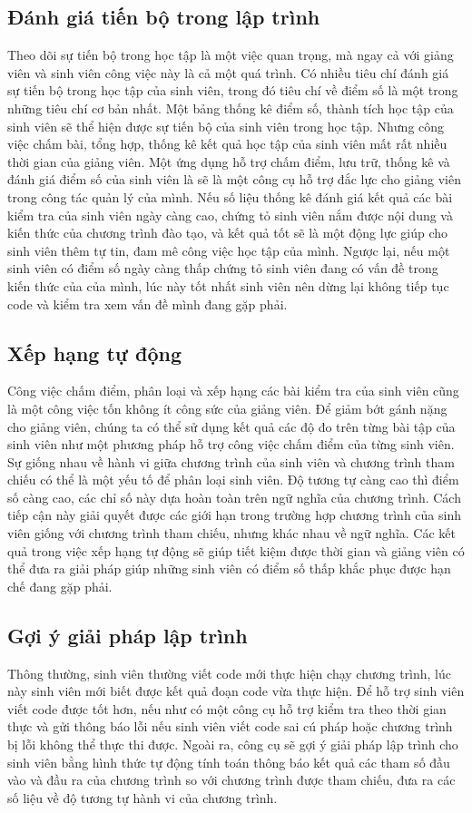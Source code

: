 \subsection{Đánh giá tiến bộ trong lập trình}
Theo dõi sự tiến bộ trong học tập là một việc quan trọng, mà ngay cả với giảng viên và sinh viên công việc này là cả một quá trình. Có nhiều tiêu chí đánh giá sự tiến bộ trong học tập của sinh viên, trong đó tiêu chí về điểm số là một trong những tiêu chí cơ bản nhất. Một bảng thống kê điểm số, thành tích học tập của sinh viên sẽ thể hiện được sự tiến bộ của sinh viên trong học tập. Nhưng công việc chấm bài, tổng hợp, thống kê kết quả học tập của sinh viên mất rất nhiều thời gian của giảng viên. Một ứng dụng hỗ trợ chấm điểm, lưu trữ, thống kê và đánh giá điểm số của sinh viên là sẽ là một công cụ hỗ trợ đắc lực cho giảng viên trong công tác quản lý của mình. Nếu số liệu thống kê đánh giá kết quả các bài kiểm tra của sinh viên ngày càng cao, chứng tỏ sinh viên nắm được nội dung và kiến thức của chương trình đào tạo, và kết quả tốt sẽ là một động lực giúp cho sinh viên thêm tự tin, đam mê công việc học tập của mình. Ngược lại, nếu một sinh viên có điểm số ngày càng thấp chứng tỏ sinh viên đang có vấn đề trong kiến thức của của mình, lúc này tốt nhất sinh viên nên dừng lại không tiếp tục code và kiểm tra xem vấn đề mình đang gặp phải. 

\subsection{Xếp hạng tự động}
Công việc chấm điểm, phân loại và xếp hạng các bài kiểm tra của sinh viên cũng là một công việc tốn không ít công sức của giảng viên. Để giảm bớt gánh nặng cho giảng viên, chúng ta có thể sử dụng kết quả các độ đo trên từng bài tập của sinh viên như một phương pháp hỗ trợ công việc chấm điểm của từng sinh viên. Sự giống nhau về hành vi giữa chương trình của sinh viên và chương trình tham chiếu có thể là một yếu tố để phân loại sinh viên. Độ tương tự càng cao thì điểm số càng cao, các chỉ số này dựa hoàn toàn trên ngữ nghĩa của chương trình. Cách tiếp cận này giải quyết được các giới hạn trong trường hợp chương trình của sinh viên giống với chương trình tham chiếu, nhưng khác nhau về ngữ nghĩa. Các kết quả trong việc xếp hạng tự động sẽ giúp tiết kiệm được thời gian và giảng viên có thể đưa ra giải pháp giúp những sinh viên có điểm số thấp khắc phục được hạn chế đang gặp phải.

\subsection{Gợi ý giải pháp lập trình}
Thông thường, sinh viên thường viết code mới thực hiện chạy chương trình, lúc này sinh viên mới biết được kết quả đoạn code vừa thực hiện. Để hỗ trợ sinh viên viết code được tốt hơn, nếu như có một công cụ hỗ trợ kiểm tra theo thời gian thực và gửi thông báo lỗi nếu sinh viên viết code sai cú pháp hoặc chương trình bị lỗi không thể thực thi được. Ngoài ra, công cụ sẽ gợi ý giải pháp lập trình cho sinh viên bằng hình thức tự động tính toán thông báo kết quả các tham số đầu vào và đầu ra của chương trình so với chương trình được tham chiếu, đưa ra các số liệu về độ tương tự hành vi của chương trình.	

